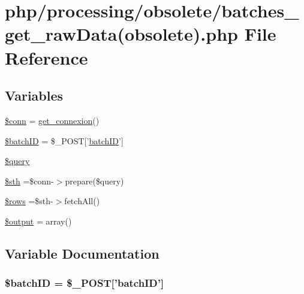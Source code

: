 \hypertarget{batches__get__raw_data_07obsolete_08_8php}{\section{php/processing/obsolete/batches\-\_\-get\-\_\-raw\-Data(obsolete).php File Reference}
\label{batches__get__raw_data_07obsolete_08_8php}
}
\subsection*{Variables}
\begin{DoxyCompactItemize}
\item 
\hyperlink{batches__get__raw_data_07obsolete_08_8php_aa8a5a87b9c1a6a0819b88447cbe41877}{\$conn} = \hyperlink{php__functions_8php_ace18bc10f3fd08f92688ac743e0d8c2e}{get\-\_\-connexion}()
\item 
\hyperlink{batches__get__raw_data_07obsolete_08_8php_aaa6d122ea9cb55b210aadd86e5654a74}{\$batch\-I\-D} = \$\-\_\-\-P\-O\-S\-T\mbox{[}'\hyperlink{obsolete_2processing__bak_8php_a88c5bc4262b7c34f236357f5c53fc99b}{batch\-I\-D}'\mbox{]}
\item 
\hyperlink{batches__get__raw_data_07obsolete_08_8php_af59a5f7cd609e592c41dc3643efd3c98}{\$query}
\item 
\hyperlink{batches__get__raw_data_07obsolete_08_8php_afa9126f9664959c02795be300a135f93}{\$sth} =\$conn-\/$>$prepare(\$query)
\item 
\hyperlink{batches__get__raw_data_07obsolete_08_8php_ace2ec39e7df3899fa8df9640ec274b03}{\$rows} =\$sth-\/$>$fetch\-All()
\item 
\hyperlink{batches__get__raw_data_07obsolete_08_8php_a73004ce9cd673c1bfafd1dc351134797}{\$output} = array()
\end{DoxyCompactItemize}


\subsection{Variable Documentation}
\hypertarget{batches__get__raw_data_07obsolete_08_8php_aaa6d122ea9cb55b210aadd86e5654a74}{
\subsubsection[{\$batch\-I\-D}]{\setlength{\rightskip}{0pt plus 5cm}\${\bf batch\-I\-D} = \$\-\_\-\-P\-O\-S\-T\mbox{[}'{\bf batch\-I\-D}'\mbox{]}}}\label{batches__get__raw_data_07obsolete_08_8php_aaa6d122ea9cb55b210aadd86e5654a74}


